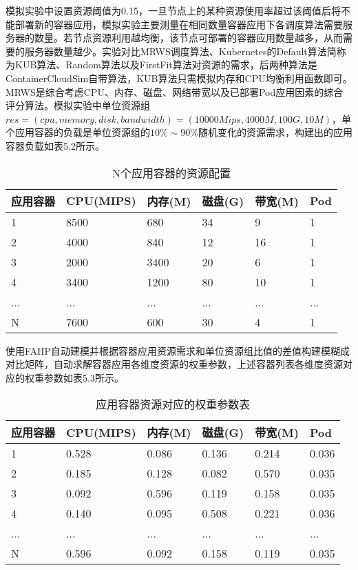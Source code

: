 模拟实验中设置资源阈值为0.15，一旦节点上的某种资源使用率超过该阈值后将不能部署新的容器应用，模拟实验主要测量在相同数量容器应用下各调度算法需要服务器的数量。若节点资源利用越均衡，该节点可部署的容器应用数量越多，从而需要的服务器数量越少。实验对比MRWS调度算法、Kubernetes的Default算法简称为KUB算法、Random算法以及FirstFit算法对资源的需求，后两种算法是ContainerCloudSim自带算法，KUB算法只需模拟内存和CPU均衡利用函数即可。MRWS是综合考虑CPU、内存、磁盘、网络带宽以及已部署Pod应用因素的综合评分算法。模拟实验中单位资源组$res=(cpu,memory,disk,bandwidth)=(10000Mips,4000M,100G,10M)$，单个应用容器的负载是单位资源组的$10\%\sim 90\%$随机变化的资源需求，构建出的应用容器负载如表5.2所示。
\begin{table}[H]
	\centering\dawu[1.3]
	\caption{N个应用容器的资源配置}
	\begin{tabular}{|p{1.8cm}<{\centering}|p{1.8cm}<{\centering}|p{1.8cm}<{\centering}|p{1.8cm}<{\centering}|p{1.8cm}<{\centering}|p{1.8cm}<{\centering}|} \hline
		应用容器 & CPU(MIPS) & 内存(M) & 磁盘(G) & 带宽(M) & Pod \\ \hline
		 1 & 8500 & 680 & 34 & 9 &1 \\ \hline
		 2 & 4000 & 840 & 12 & 16 & 1 \\ \hline
		 3 & 2000 & 3400 & 20 & 6 & 1 \\ \hline
		 4 & 3400 & 1200 & 80 & 10 & 1 \\ \hline
		 ... & ... & ... & ... & ... & ... \\ \hline
		 N & 7600 & 600 & 30 & 4 & 1 \\ \hline
	\end{tabular}
\end{table}
使用FAHP自动建模并根据容器应用资源需求和单位资源组比值的差值构建模糊成对比矩阵，自动求解容器应用各维度资源的权重参数，上述容器列表各维度资源对应的权重参数如表5.3所示。
\begin{table}[H]
	\centering\dawu[1.3]
	\caption{应用容器资源对应的权重参数表}
	\begin{tabular}{|p{1.8cm}<{\centering}|p{1.8cm}<{\centering}|p{1.8cm}<{\centering}|p{1.8cm}<{\centering}|p{1.8cm}<{\centering}|p{1.8cm}<{\centering}|} \hline
		应用容器 & CPU(MIPS) & 内存(M) & 磁盘(G) & 带宽(M) & Pod \\ \hline
		 1 & 0.528 & 0.086 & 0.136 & 0.214 & 0.036 \\ \hline
		 2 & 0.185 & 0.128 & 0.082 & 0.570 & 0.035 \\ \hline
		 3 & 0.092 & 0.596 & 0.119 & 0.158 & 0.035 \\ \hline
		 4 & 0.140 & 0.095 & 0.508 & 0.221 & 0.036 \\ \hline
		 ... & ... & ... & ... & ... & ... \\ \hline
		 N & 0.596 & 0.092 & 0.158 & 0.119 & 0.035 \\ \hline
	\end{tabular}
\end{table}
